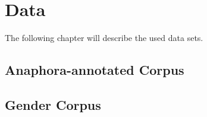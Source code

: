 \chapter{Data}
\label{sec:Data}

The following chapter will describe the used data sets.

\section{Anaphora-annotated Corpus}


\citep{wikicoref2016}
\section{Gender Corpus}
\citep{bergsma2006bootstrapping}
